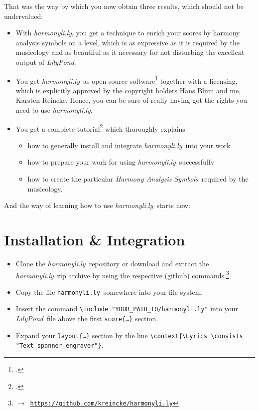 \documentclass[
  DIV=calc,
  BCOR=5mm,
  12pt,
  headings=small,
  oneside,
  abstract=true,
  toc=bib,
  xcolor=dvipsnames,
  openany,
  ngerman,english]{scrartcl}
\newcommand{\acc}[0]{\textit}
\newcommand{\ra}[0]{$\rightarrow$}
\newcommand{\lnkr}[1]{\ra\ \href{#1}{\texttt{#1}}}
\newcommand{\hlyn}[0]{\textit{harmonyli.ly}}
\newcommand{\hlyf}[0]{\texttt{harmonyli.ly}}
\newcommand{\lily}[0]{\textit{LilyPond}}
\newcommand{\has}[1]{\textit{Harmony Analysis Symbol#1}}
\begin{document}
That was the way by which you now obtain three results, which should not be
undervalued:
\begin{itemize}
  \item With \hlyn, you get a technique to enrich your scores by
  harmony analysis symbols on a level, which is as expressive as it is required
  by the musicology and as beautiful as it necessary for not disturbing the
  excellent output of \acc{LilyPond}.
  \item You get \hlyn\ as open source software\footcite[cf.][\nopage wp]{ReinckeBlum2019a} together with a licensing, which is explicitly approved
  by the copyright holders Hans Blum and me, Karsten Reincke. Hence, you can be
  sure of really having got the rights you need to use \hlyn.
  \item You get a complete tutorial\footcite[cf.][\nopage wp]{Reincke2019b} which
  thoroughly explains
  \begin{itemize}
    \item how to generally install and integrate \hlyn\ into your work
    \item how to prepare your work for using \hlyn\ successfully
    \item how to create the particular \has{s}\ required by the musicology.
  \end{itemize}
\end{itemize}

And the way of learning how to use \hlyn\ starts now:

\section{Installation \& Integration}
\begin{itemize}
  \item Clone the \hlyn\ repository or download and extract the \hlyn\ zip
  archive by using the respective (github)
  commands.\footnote{\lnkr{https://github.com/kreincke/harmonyli.ly}}
  \item Copy the file \hlyf\ somewhere into your file system.
  \item Insert the command \texttt{\textbackslash include 
  "YOUR\_PATH\_TO/harmonyli.ly"} into
  your \lily\ file above the first \texttt{score\{\ldots\}} section.
  \item Expand your \texttt{layout\{\ldots\}} section by the line
   \texttt{\textbackslash context\{\textbackslash Lyrics \textbackslash consists
   "Text\_spanner\_engraver"\}}.
\end{itemize}
\end{document}
